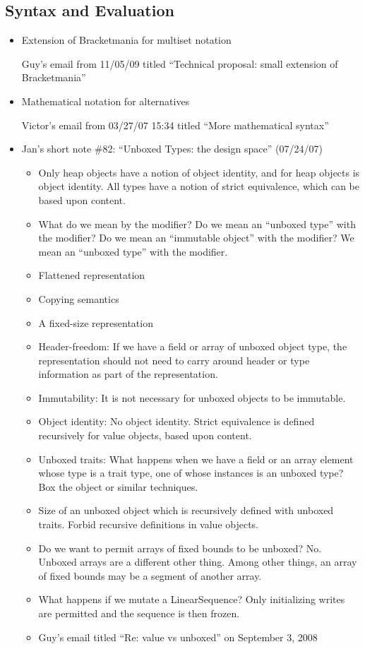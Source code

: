\subsection{Syntax and Evaluation}
\begin{itemize}
\item Extension of Bracketmania for multiset notation

Guy's email from 11/05/09 titled ``Technical proposal: small extension of Bracketmania''

\item Mathematical notation for alternatives

Victor's email from 03/27/07 15:34
titled ``More mathematical syntax''

\item Jan's short note \#82: ``Unboxed Types: the design space'' (07/24/07)
 \begin{itemize}
\item Only heap objects have a notion of object identity, and for heap objects
 is object identity. All types have a notion of strict equivalence, which can be based upon content.
\item What do we mean by the  modifier? Do we mean an ``unboxed type'' with the  modifier? Do we mean an ``immutable object'' with the  modifier? We mean an ``unboxed type'' with the  modifier.
\item Flattened representation
\item Copying semantics
\item A fixed-size representation
\item Header-freedom: If we have a field or array of unboxed object type, the representation should not need to carry around header or type information as part of the representation.
\item Immutability: It is not necessary for unboxed objects to be immutable.
\item Object identity: No object identity. Strict equivalence is defined recursively for value objects, based upon content.
\item Unboxed traits: What happens when we have a field or an array element whose type is a trait type, one of whose instances is an unboxed type? Box the object or similar techniques.
\item Size of an unboxed object which is recursively defined with unboxed traits. Forbid recursive definitions in value objects.
\item Do we want to permit arrays of fixed bounds to be unboxed? No. Unboxed arrays are a different other thing. Among other things, an array of fixed bounds may be a segment of another array.
\item What happens if we mutate a LinearSequence? Only initializing writes are permitted and the sequence is then frozen.
\item Guy's email titled ``Re: value vs unboxed'' on September 3, 2008
 \end{itemize}


\end{itemize}
